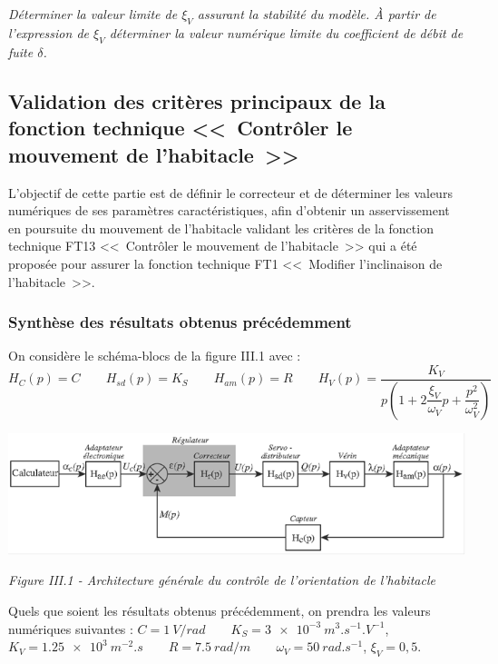 \documentclass[10pt,fleqn]{article} %
\begin{document}
\begin{multicols}{2}
\subparagraph{}\textit{Déterminer la valeur limite de $\xi_V$ assurant la stabilité du modèle. À partir de l'expression de $\xi_V$ déterminer la valeur numérique limite du coefficient de débit de fuite $\delta$.}

\ifprof
\begin{corrige}
\end{corrige}
\else
\fi



\subsection*{Validation des critères principaux de la fonction technique <<~Contrôler le mouvement de l'habitacle~>> }

\begin{obj}
L'objectif de cette partie est de définir le correcteur et de déterminer les valeurs numériques de ses paramètres caractéristiques, afin d'obtenir un asservissement en poursuite du mouvement de l'habitacle validant les critères de la fonction technique FT13 <<~Contrôler le mouvement de l'habitacle~>> qui a été proposée pour assurer la fonction technique FT1 <<~Modifier l'inclinaison de l'habitacle~>>.
\end{obj}

\subsubsection*{Synthèse des résultats obtenus précédemment}


On considère le schéma-blocs de la figure III.1 avec :
$$
H_C(p)=C \quad \quad H_{sd}(p)=K_S \quad \quad H_{am}(p)=R \quad \quad  H_{V}(p)=\dfrac{K_V}{p\left(1+ 2\dfrac{\xi_V}{\omega_V}p + \dfrac{p^2}{\omega_V^2} \right)}
$$


\begin{center}
\includegraphics[width=.9\linewidth]{images/pt_06}

\textit{Figure III.1 - Architecture générale du contrôle de l'orientation de l'habitacle}
\end{center}

Quels que soient les résultats obtenus précédemment, on prendra les valeurs numériques suivantes :
$C = \SI{1}{V/rad} \quad\quad K_S = \SI{3e-3}{m^3.s^{-1}.V^{-1}} $, $K_V = \SI{1,25e3}{m^{-2}.s}\quad\quad  R = \SI{7,5}{rad/m} \quad \quad  \omega_V=\SI{50}{rad.s^{-1}} $, $ \xi_V = 0,5.$



\end{multicols}
\end{document}

